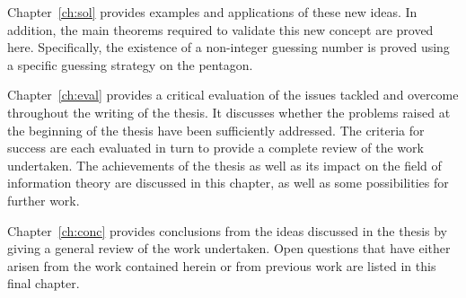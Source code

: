 Chapter~\ref{ch:sol} provides examples and applications of these new ideas. In addition, the main theorems required to validate this new concept are proved here. Specifically, the existence of a non-integer guessing number is proved using a specific guessing strategy on the pentagon.

Chapter~\ref{ch:eval} provides a critical evaluation of the issues tackled and overcome throughout the writing of the thesis. It discusses whether the problems raised at the beginning of the thesis have been sufficiently addressed. The criteria for success are each evaluated in turn to provide a complete review of the work undertaken. The achievements of the thesis as well as its impact on the field of information theory are discussed in this chapter, as well as some possibilities for further work.

Chapter~\ref{ch:conc} provides conclusions from the ideas discussed in the thesis by giving a general review of the work undertaken. Open questions that have either arisen from the work contained herein or from previous work are listed in this final chapter.